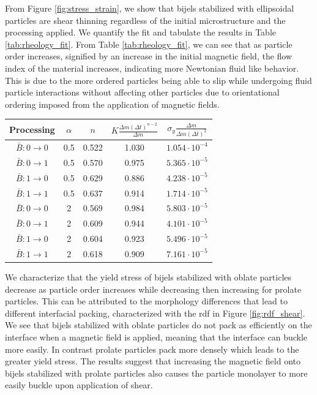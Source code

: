 From Figure \ref{fig:stress_strain}, we show that bijels stabilized with ellipsoidal particles are shear thinning regardless of the initial 
microstructure and the processing applied. We quantify the fit and tabulate the results in Table \ref{tab:rheology_fit}. From Table 
\ref{tab:rheology_fit}, we can see that as particle order increases, signified by an increase in the initial magnetic field, the flow index 
of the material increases, indicating more Newtonian fluid like behavior. This is due to the more ordered particles being able to slip
while undergoing fluid particle interactions without affecting other particles due to orientational ordering imposed from the application 
of magnetic fields.

\begin{center}
    \begin{tabular}{||c c c c c||} 
     \hline
     Processing & $\alpha$ & $n$ & $K \frac{\Delta m (\Delta t)^{n-2}}{\Delta m} $ & $\sigma_{y} \frac{\Delta m}{\Delta m (\Delta t)^2}$ \\ [0.5ex] 
     \hline\hline
     $\bar{B}: 0 \rightarrow 0$ & 0.5 & 0.522 & 1.030 & $1.054 \cdot 10^{-4}$ \\ 
     \hline
     $\bar{B}: 0 \rightarrow 1$ & 0.5 & 0.570 & 0.975 & $5.365 \cdot 10^{-5}$ \\
     \hline
     $\bar{B}: 1 \rightarrow 0$ & 0.5 & 0.629 & 0.886 & $4.238 \cdot 10^{-5}$ \\
     \hline
     $\bar{B}: 1 \rightarrow 1$ & 0.5 & 0.637 & 0.914 & $1.714 \cdot 10^{-5}$ \\
     \hline
     $\bar{B}: 0 \rightarrow 0$ & 2 & 0.569 & 0.984 & $5.803 \cdot 10^{-5}$ \\
     \hline
     $\bar{B}: 0 \rightarrow 1$ & 2 & 0.609 & 0.944 & $4.101 \cdot 10^{-5}$ \\
     \hline
     $\bar{B}: 1 \rightarrow 0$ & 2 & 0.604 & 0.923 & $5.496 \cdot 10^{-5}$ \\
     \hline
     $\bar{B}: 1 \rightarrow 1$ & 2 & 0.618 & 0.909 & $7.161 \cdot 10^{-5}$ \\ [1ex] 
     \hline
    \end{tabular}
\label{tab:rheology_fit}
\end{center}
 
We characterize that the yield stress of bijels stabilized with oblate particles decrease as particle order increases while decreasing then increasing for 
prolate particles. This can be attributed to the morphology differences that lead to different interfacial packing, characterized with the rdf in Figure 
\ref{fig:rdf_shear}. We see that bijels stabilized with oblate particles do not pack as efficiently on the interface when a magnetic field is applied,
meaning that the interface can buckle more easily. In contrast prolate particles pack more densely which leads to the greater yield stress. The results
suggest that increasing the magnetic field onto bijels stabilized with prolate particles also causes the particle monolayer to more easily buckle 
upon application of shear.